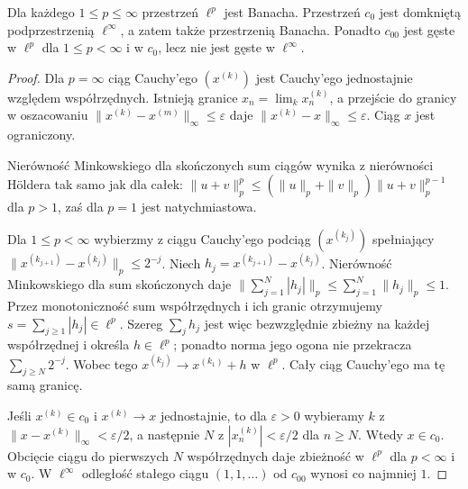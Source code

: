 \begin{twierdzenie}
\label{thm:seq-banach12}
Dla każdego $1\le p\le\infty$ przestrzeń $\ell^p$ jest Banacha.
Przestrzeń $c_0$ jest domkniętą podprzestrzenią $\ell^\infty$,
a zatem także przestrzenią Banacha. Ponadto $c_{00}$ jest gęste
w $\ell^p$ dla $1\le p<\infty$ i w $c_0$, lecz nie jest gęste
w $\ell^\infty$.
\end{twierdzenie}
\begin{proof}
Dla $p=\infty$ ciąg Cauchy'ego $(x^{(k)})$ jest Cauchy'ego
jednostajnie względem współrzędnych. Istnieją granice
$x_n=\lim_kx_n^{(k)}$, a przejście do granicy w oszacowaniu
$\|x^{(k)}-x^{(m)}\|_\infty\le\varepsilon$ daje
$\|x^{(k)}-x\|_\infty\le\varepsilon$. Ciąg $x$ jest ograniczony.

Nierówność Minkowskiego dla skończonych sum ciągów
wynika z nierówności H\"oldera tak samo jak dla całek:
$\|u+v\|_p^p\le(\|u\|_p+\|v\|_p)\|u+v\|_p^{p-1}$
dla $p>1$, zaś dla $p=1$ jest natychmiastowa.

Dla $1\le p<\infty$ wybierzmy z ciągu Cauchy'ego
podciąg $(x^{(k_j)})$ spełniający
$\|x^{(k_{j+1})}-x^{(k_j)}\|_p\le2^{-j}$.
Niech $h_j=x^{(k_{j+1})}-x^{(k_j)}$.
Nierówność Minkowskiego dla sum skończonych daje
$\|\sum_{j=1}^N|h_j|\|_p\le\sum_{j=1}^N\|h_j\|_p\le1$.
Przez monotoniczność sum współrzędnych i ich granic
otrzymujemy $s=\sum_{j\ge1}|h_j|\in\ell^p$.
Szereg $\sum_jh_j$ jest więc bezwzględnie zbieżny
na każdej współrzędnej i określa $h\in\ell^p$;
ponadto norma jego ogona nie przekracza $\sum_{j\ge N}2^{-j}$.
Wobec tego $x^{(k_j)}\to x^{(k_1)}+h$ w $\ell^p$.
Cały ciąg Cauchy'ego ma tę samą granicę.

Jeśli $x^{(k)}\in c_0$ i $x^{(k)}\to x$ jednostajnie,
to dla $\varepsilon>0$ wybieramy $k$ z
$\|x-x^{(k)}\|_\infty<\varepsilon/2$, a następnie $N$
z $|x_n^{(k)}|<\varepsilon/2$ dla $n\ge N$.
Wtedy $x\in c_0$. Obcięcie ciągu do pierwszych $N$
współrzędnych daje zbieżność w $\ell^p$ dla $p<\infty$
i w $c_0$. W $\ell^\infty$ odległość stałego ciągu
$(1,1,\ldots)$ od $c_{00}$ wynosi co najmniej $1$.
\end{proof}

